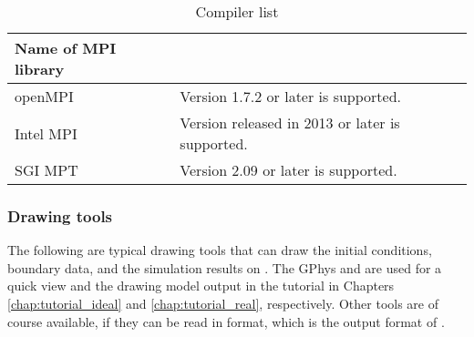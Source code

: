 \begin{table}[tb]
\begin{center}
\caption{Compiler list}
\begin{tabularx}{150mm}{|l|X|} \hline
 \rowcolor[gray]{0.9} Name of MPI library &  \\ \hline
  openMPI               & Version 1.7.2 or later is supported. \\ \hline
  Intel MPI             & Version released in 2013 or later is supported.\\ \hline
  SGI MPT               & Version 2.09 or later is supported. \\ \hline
\end{tabularx}
\label{tab:compatible_mpi}
\end{center}
\end{table}






\subsubsection{Drawing tools}

The following are typical drawing tools that can draw
the initial conditions, boundary data, and the simulation results on \scalelib.
The GPhys and \grads are used for a quick view
and the drawing model output in the tutorial in Chapters \ref{chap:tutorial_ideal} and \ref{chap:tutorial_real}, respectively.
Other tools are of course available,
if they can be read in \netcdf format, which is the output format of \scalelib.

